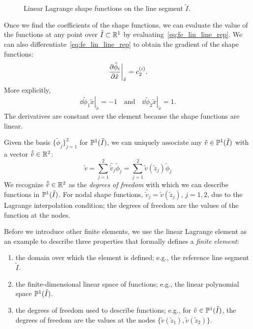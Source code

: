 \begin{figure}
  \centering
  \caption{Linear Lagrange shape functions on the line segment $\tilde I$. \label{fig:fe_shape_line_p1}}
\end{figure}

Once we find the coefficients of the shape functions, we can evaluate the value of the functions at any point over $\tilde I \subset \mathbb{R}^1$ by evaluating~\eqref{eq:fe_lin_line_rep}. We can also differentiate~\eqref{eq:fe_lin_line_rep} to obtain the gradient of the shape functions:
\begin{align*}
  \left. \frac{\partial \tilde \phi_i}{\partial \tilde x} \right|_{\tilde x} = c_2^{(i)}.
\end{align*}
More explicitly,
\begin{align*}
  \left. \dd{\tilde \phi_1}{\tilde x} \right|_{\tilde x} = -1
  \quad \text{and} \quad 
  \left. \dd{\tilde \phi_2}{\tilde x} \right|_{\tilde x} = 1.
\end{align*}
The derivatives are constant over the element because the shape functions are linear.

Given the basis $\{\tilde \phi_j\}_{j=1}^2$ for $\mathbb{P}^1(\tilde I)$, we can uniquely associate any $\tilde v \in \mathbb{P}^1(\tilde I)$ with a vector $\hat{\tilde v} \in \mathbb{R}^2$: 
\begin{equation*}
  \tilde v = \sum_{j=1}^2 \hat{\tilde{v}}_j \tilde \phi_j = \sum_{j=1}^2 \tilde v(\tilde z_j) \tilde \phi_j
\end{equation*}
We recognize $\hat{\tilde v} \in \mathbb{R}^2$ as the \emph{degrees of freedom} with which we can describe functions in $\mathbb{P}^1(\tilde I)$. For nodal shape functions, $\hat{\tilde v}_j = \tilde v(\tilde z_j)$, $j = 1,2$, due to the Lagrange interpolation condition; the degrees of freedom are the values of the function at the nodes.

Before we introduce other finite elements, we use the linear Lagrange element as an example to describe three properties that formally defines a \emph{finite element}:
\begin{enumerate}
\item the domain over which the element is defined; e.g., the reference line segment $\tilde I$.
\item the finite-dimensional linear space of functions; e.g., the linear polynomial space $\mathbb{P}^1(\tilde I)$.
\item the degrees of freedom used to describe functions; e.g., for $\tilde v \in \mathbb{P}^1(\tilde I)$, the degrees of freedom are the values at the nodes $\{ \tilde v(\tilde z_1), \tilde v(\tilde z_2) \}$.
\end{enumerate}



